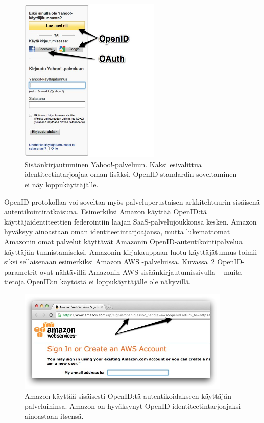 \documentclass[finnish,gradu]{tktltiki}
\begin{document}
  \begin{figure}[h!]
    \centering
    \includegraphics[width=0.6\textwidth]{images/yahoo_login.jpg}
    \caption{Sisäänkirjautuminen Yahoo!-palveluun. Kaksi esivalittua identiteetintarjoajaa oman lisäksi. OpenID-standardin soveltaminen ei näy loppukäyttäjälle.}
    \label{fig:yahoo_login}
  \end{figure}

  OpenID-protokollaa voi soveltaa myös palveluperustaisen arkkitehtuurin sisäisenä autentikointiratkaisuna. Esimerkiksi Amazon käyttää OpenID:tä käyttäjäidentiteettien federointiin laajan SaaS-palvelujoukkonsa kesken. Amazon hyväksyy ainoastaan oman identiteetintarjoajansa, mutta lukemattomat Amazonin omat palvelut käyttävät Amazonin OpenID-autentikointipalvelua käyttäjän tunnistamiseksi. Amazonin kirjakauppaan luotu käyttäjätunnus toimii siksi sellaisenaan esimerkiksi Amazon AWS -palveluissa. Kuvassa~\ref{fig:amazon_openid} OpenID-parametrit ovat nähtävillä Amazonin AWS-sisäänkirjautumissivulla -- muita tietoja OpenID:n käytöstä ei loppukäyttäjälle ole näkyvillä.

  \begin{figure}
    \centering
    \includegraphics[width=0.9\textwidth]{images/amazon_openid.jpg}
    \caption{Amazon käyttää sisäisesti OpenID:tä autentikoidakseen käyttäjän palveluihinsa. Amazon on hyväksynyt  OpenID-identiteetintarjoajaksi ainoastaan itsensä.}
    \label{fig:amazon_openid}
  \end{figure}
\end{document}
